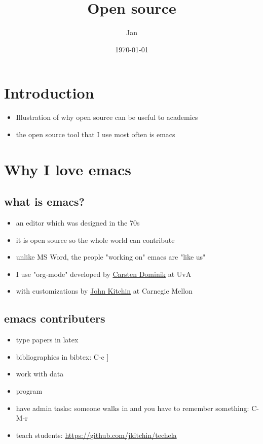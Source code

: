 \documentclass[11pt]{article}
\author{Jan}
\date{\today}
\title{Open source}
\begin{document}
\setcounter{tocdepth}{1}
\tableofcontents


\section*{Introduction}
\label{sec:org53c900f}

\begin{itemize}
\item Illustration of why open source can be useful to academics
\item the open source tool that I use most often is emacs
\end{itemize}

\section*{Why I love emacs}
\label{sec:orga8467e8}
\subsection*{what is emacs?}
\label{sec:org826b2b5}
\begin{itemize}
\item an editor which was designed in the 70s
\item it is open source so the whole world can contribute
\item unlike MS Word, the people "working on" emacs are "like us"
\item I use "org-mode" developed by \href{https://staff.fnwi.uva.nl/c.dominik/}{Carsten Dominik} at UvA
\item with customizations by \href{http://kitchingroup.cheme.cmu.edu/scimax}{John Kitchin} at Carnegie Mellon
\end{itemize}

\subsection*{emacs contributers}
\label{sec:org490b9dc}
\begin{itemize}
\item type papers in latex
\item bibliographies in bibtex: C-c ]
\item work with data
\item program
\item have admin tasks: someone walks in and you have to remember something: C-M-r
\item teach students: \url{https://github.com/jkitchin/techela}
\end{itemize}
\end{document}
